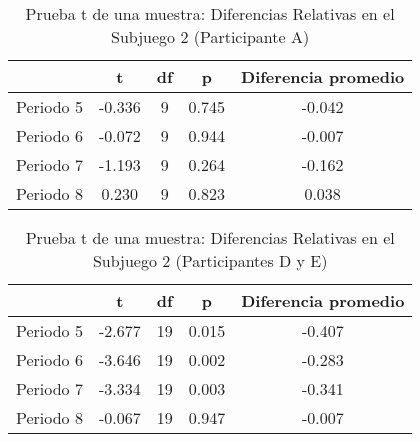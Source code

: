 \begin{table}[h]
\caption[Prueba t de una muestra: Diferencias Relativas en el Subjuego 2 (Participante A)]{Prueba t de una muestra: Diferencias Relativas en el Subjuego 2 (Participante A)}
\label{DN-S1}
\centering
\begin{tabular}{l | c c c | c}
\toprule
\textbf{} & \textbf{t} & \textbf{df} & \textbf{p} & \textbf{Diferencia promedio}\\
\midrule
Periodo 5 & -0.336 & 9 & 0.745 & -0.042\\
Periodo 6 & -0.072 & 9 & 0.944 & -0.007\\
Periodo 7 & -1.193 & 9 & 0.264 & -0.162\\
Periodo 8 & 0.230 & 9 & 0.823 & 0.038\\
\bottomrule
\end{tabular}
\end{table}











\begin{table}[h]
\caption[Prueba t de una muestra: Diferencias Relativas en el Subjuego 2 (Participantes D y E)]{Prueba t de una muestra: Diferencias Relativas en el Subjuego 2 (Participantes D y E)}
\label{DN-S1}
\centering
\begin{tabular}{l | c c c | c}
\toprule
\textbf{} & \textbf{t} & \textbf{df} & \textbf{p} & \textbf{Diferencia promedio}\\
\midrule
Periodo 5 & -2.677 & 19 & 0.015 & -0.407\\
Periodo 6 & -3.646 & 19 & 0.002 & -0.283\\
Periodo 7 & -3.334 & 19 & 0.003 & -0.341\\
Periodo 8 & -0.067 & 19 & 0.947 & -0.007\\
\bottomrule
\end{tabular}
\end{table}


















